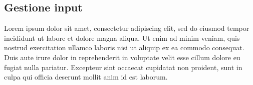 \subsection{Gestione input}
Lorem ipsum dolor sit amet, consectetur adipiscing elit, sed do eiusmod tempor incididunt ut labore et dolore magna aliqua. Ut enim ad minim veniam, quis nostrud exercitation ullamco laboris nisi ut aliquip ex ea commodo consequat. Duis aute irure dolor in reprehenderit in voluptate velit esse cillum dolore eu fugiat nulla pariatur. Excepteur sint occaecat cupidatat non proident, sunt in culpa qui officia deserunt mollit anim id est laborum.

\cite{CPP_Primer}
\cite{Computer_Networking_and_the_Internet}
\cite{Ingegneria_del_software}
\cite{Understanding_the_Linux_Kernel}
\cite{Windows_Server_2012}